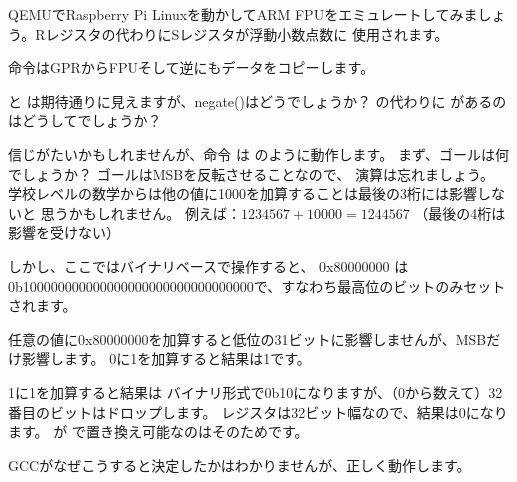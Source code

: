 


QEMUでRaspberry Pi Linuxを動かしてARM FPUをエミュレートしてみましょう。Rレジスタの代わりにSレジスタが浮動小数点数に
使用されます。


\FMRS 命令は\ac{GPR}からFPUそして逆にもデータをコピーします。

 と  は期待通りに見えますが、negate()はどうでしょうか？
\XOR の代わりに \ADD があるのはどうしてでしょうか？

信じがたいかもしれませんが、命令
は
のように動作します。
まず、ゴールは何でしょうか？
ゴールは\ac{MSB}を反転させることなので、 \XOR 演算は忘れましょう。
学校レベルの数学からは他の値に1000を加算することは最後の3桁には影響しないと
思うかもしれません。
例えば：$1234567 + 10000 = 1244567$ （最後の4桁は影響を受けない）

しかし、ここではバイナリベースで操作すると、
0x80000000 は 0b100000000000000000000000000000000で、すなわち最高位のビットのみセットされます。

任意の値に0x80000000を加算すると低位の31ビットに影響しませんが、\ac{MSB}だけ影響します。
0に1を加算すると結果は1です。

1に1を加算すると結果は バイナリ形式で0b10になりますが、（0から数えて）32番目のビットはドロップします。
レジスタは32ビット幅なので、結果は0になります。
\XOR が \ADD で置き換え可能なのはそのためです。

GCCがなぜこうすると決定したかはわかりませんが、正しく動作します。
